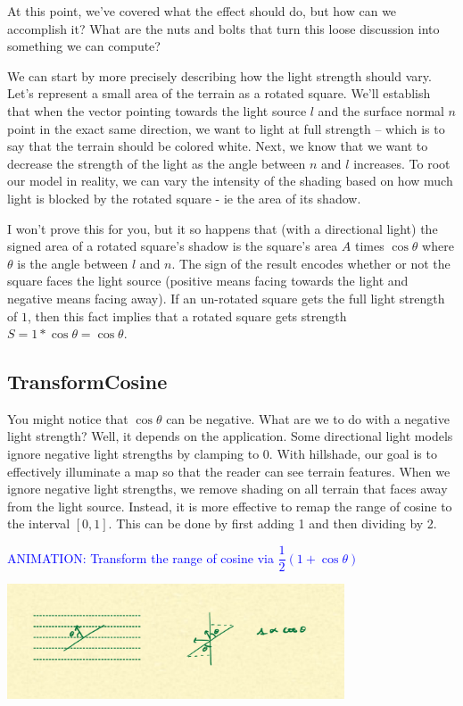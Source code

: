 \documentclass{article}
\newcommand\animation[1]{\textcolor{blue}{ANIMATION: #1}}
\begin{document}
At this point, we've covered what the effect should do, but how can we accomplish it?
What are the nuts and bolts that turn this loose discussion into something we can compute?

We can start by more precisely describing how the light strength should vary.
Let's represent a small area of the terrain as a rotated square.
We'll establish that when the vector pointing towards the light source $l$ and the surface normal $n$ point in the exact same direction, we want to light at full strength -- which is to say that the terrain should be colored white.
Next, we know that we want to decrease the strength of the light as the angle between $n$ and $l$ increases.
To root our model in reality, we can vary the intensity of the shading based on how much light is blocked by the rotated square - ie the area of its shadow.

I won't prove this for you, but it so happens that (with a directional light) the signed area of a rotated square's shadow is the square's area $A$ times $\cos \theta$ where $\theta$ is the angle between $l$ and $n$.
The sign of the result encodes whether or not the square faces the light source (positive means facing towards the light and negative means facing away).
If an un-rotated square gets the full light strength of $1$, then this fact implies that a rotated square gets strength $S = 1 * \cos \theta = \cos \theta$.

\subsection{TransformCosine}

You might notice that $\cos \theta$ can be negative.
What are we to do with a negative light strength?
Well, it depends on the application.
Some directional light models ignore negative light strengths by clamping to 0.
With hillshade, our goal is to effectively illuminate a map so that the reader can see terrain features.
When we ignore negative light strengths, we remove shading on all terrain that faces away from the light source.
Instead, it is more effective to remap the range of cosine to the interval $[0, 1]$.
This can be done by first adding 1 and then dividing by 2.
 
\animation{Transform the range of cosine via $\dfrac{1}{2}(1 + \cos \theta)$}

\begin{center}
	\includegraphics[width=0.75\textwidth,frame]{assets/cosine.jpg}
\end{center}
\end{document}
